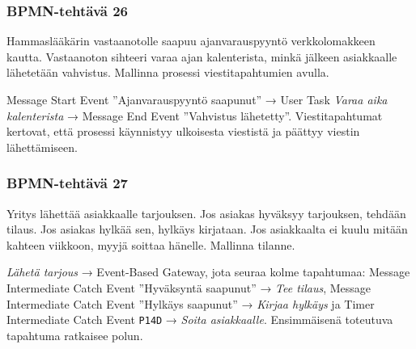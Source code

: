 \documentclass[
  finnish,
  letterpaper,
  DIV=11,
  numbers=noendperiod,
  oneside]{scrreprt}
\begin{document}
\subsubsection{BPMN-tehtävä 26}\label{bpmn-tehtuxe4vuxe4-26}

Hammaslääkärin vastaanotolle saapuu ajanvarauspyyntö verkkolomakkeen
kautta. Vastaanoton sihteeri varaa ajan kalenterista, minkä jälkeen
asiakkaalle lähetetään vahvistus. Mallinna prosessi viestitapahtumien
avulla.

\begin{tcolorbox}[enhanced jigsaw, arc=.35mm, bottomrule=.15mm, bottomtitle=1mm, breakable, colback=white, colbacktitle=quarto-callout-tip-color!10!white, colframe=quarto-callout-tip-color-frame, coltitle=black, left=2mm, leftrule=.75mm, opacityback=0, opacitybacktitle=0.6, rightrule=.15mm, title=\textcolor{quarto-callout-tip-color}{\faLightbulb}\hspace{0.5em}{Malliratkaisu}, titlerule=0mm, toprule=.15mm, toptitle=1mm]

Message Start Event ''Ajanvarauspyyntö saapunut'' → User Task
\emph{Varaa aika kalenterista} → Message End Event ''Vahvistus
lähetetty''. Viestitapahtumat kertovat, että prosessi käynnistyy
ulkoisesta viestistä ja päättyy viestin lähettämiseen.

\end{tcolorbox}

\subsubsection{BPMN-tehtävä 27}\label{bpmn-tehtuxe4vuxe4-27}

Yritys lähettää asiakkaalle tarjouksen. Jos asiakas hyväksyy tarjouksen,
tehdään tilaus. Jos asiakas hylkää sen, hylkäys kirjataan. Jos
asiakkaalta ei kuulu mitään kahteen viikkoon, myyjä soittaa hänelle.
Mallinna tilanne.

\begin{tcolorbox}[enhanced jigsaw, arc=.35mm, bottomrule=.15mm, bottomtitle=1mm, breakable, colback=white, colbacktitle=quarto-callout-tip-color!10!white, colframe=quarto-callout-tip-color-frame, coltitle=black, left=2mm, leftrule=.75mm, opacityback=0, opacitybacktitle=0.6, rightrule=.15mm, title=\textcolor{quarto-callout-tip-color}{\faLightbulb}\hspace{0.5em}{Malliratkaisu}, titlerule=0mm, toprule=.15mm, toptitle=1mm]

\emph{Lähetä tarjous} → Event-Based Gateway, jota seuraa kolme
tapahtumaa: Message Intermediate Catch Event ''Hyväksyntä saapunut'' →
\emph{Tee tilaus}, Message Intermediate Catch Event ''Hylkäys saapunut''
→ \emph{Kirjaa hylkäys} ja Timer Intermediate Catch Event \texttt{P14D}
→ \emph{Soita asiakkaalle}. Ensimmäisenä toteutuva tapahtuma ratkaisee
polun.

\end{tcolorbox}
\end{document}
